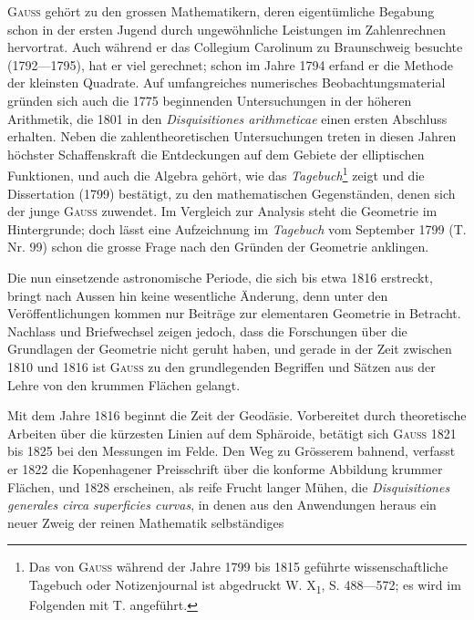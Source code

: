 \noindent\hspace*{\parindent}\textsc{Gauss} gehört zu den grossen Mathematikern, deren eigentümliche Begabung
schon in der ersten Jugend durch ungewöhnliche Leistungen im
Zahlenrechnen hervortrat. Auch während er das Collegium Carolinum zu
Braunschweig besuchte (1792—1795), hat er viel gerechnet; schon im Jahre
1794 erfand er die Methode der kleinsten Quadrate. Auf umfangreiches
numerisches Beobachtungsmaterial gründen sich auch die 1775 beginnenden
Untersuchungen in der höheren Arithmetik, die 1801 in den \textit{Disquisitiones
arithmeticae} einen ersten Abschluss erhalten. Neben die zahlentheoretischen
Untersuchungen treten in diesen Jahren höchster Schaffenskraft die
\clearpage{}
\setcounter{footnote}{0}
\noindent Entdeckungen auf dem Gebiete der elliptischen Funktionen, und auch die Algebra
gehört, wie das \textit{Tagebuch}\footnote{Das von \textsc{Gauss} während der Jahre 1799 bis 1815 geführte wissenschaftliche Tagebuch oder Notizenjournal ist abgedruckt W. X\textsubscript{1}, S. 488—572; es wird im Folgenden mit T. angeführt.} zeigt und die Dissertation (1799) bestätigt,
zu den mathematischen Gegenständen, denen sich der junge \textsc{Gauss} zuwendet.
Im Vergleich zur Analysis steht die Geometrie im Hintergrunde; doch lässt
eine Aufzeichnung im \textit{Tagebuch} vom September 1799 (T. Nr. 99) schon die
grosse Frage nach den Gründen der Geometrie anklingen.
\par
Die nun einsetzende astronomische Periode, die sich bis etwa 1816 erstreckt,
bringt nach Aussen hin keine wesentliche Änderung, denn unter den
Veröffentlichungen kommen nur Beiträge zur elementaren Geometrie in Betracht.
Nachlass und Briefwechsel zeigen jedoch, dass die Forschungen über
die Grundlagen der Geometrie nicht geruht haben, und gerade in der Zeit
zwischen 1810 und 1816 ist \textsc{Gauss} zu den grundlegenden Begriffen und Sätzen
aus der Lehre von den krummen Flächen gelangt.
\par
Mit dem Jahre 1816 beginnt die Zeit der Geodäsie. Vorbereitet durch
theoretische Arbeiten über die kürzesten Linien auf dem Sphäroide, betätigt
sich \textsc{Gauss} 1821 bis 1825 bei den Messungen im Felde. Den Weg zu
Grösserem bahnend, verfasst er 1822 die Kopenhagener Preisschrift über die
konforme Abbildung krummer Flächen, und 1828 erscheinen, als reife Frucht
langer Mühen, die \textit{Disquisitiones generales circa superficies curvas}, in denen aus
den Anwendungen heraus ein neuer Zweig der reinen Mathematik selbständiges
